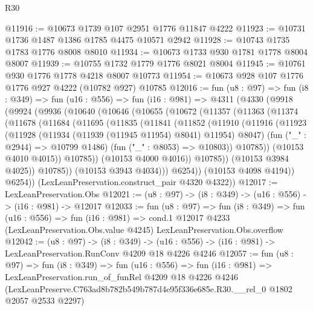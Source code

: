 \begin{lexlean}{R30}
\begin{coremodule}
@11916 := @10673 @1739 @107 @2951 @1776 @11847 @4222
@11923 := @10731 @1736 @1487 @1386 @1785 @4475 @10571 @2942
@11928 := @10743 @1735 @1783 @1776 @8008 @8010
@11934 := @10673 @1733 @930 @1781 @1778 @8004 @8007
@11939 := @10755 @1732 @1779 @1776 @8021 @8004
@11945 := @10761 @930 @1776 @1778 @4218 @8007 @10773
@11954 := @10673 @928 @107 @1776 @1776 @927 @4222 (@10782 @927) @10785
@12016 := fun (u8 : @97) =>
  fun (i8 : @349) =>
  fun (u16 : @556) =>
  fun (i16 : @981) =>
  @4311
    (@4330
      (@9918
        (@9924
          (@9936
            (@10640
              (@10646
                (@10655
                  (@10672
                    (@11357
                      (@11363
                        (@11374
                          (@11678
                            (@11684
                              (@11695
                                (@11835
                                  (@11841
                                    (@11852
                                      (@11910
                                        (@11916
                                          (@11923
                                            (@11928
                                              (@11934 (@11939 (@11945 @11954) @8041) @11954)
                                              @8047)
                                            (fun ("_" : @2944) => @10799 @1486)
                                            (fun ("_" : @8053) => @10803))
                                          @10785))
                                      (@10153 @4010 @4015))
                                    @10785))
                                (@10153 @4000 @4016))
                              @10785))
                          (@10153 @3984 @4025))
                        @10785))
                    (@10153 @3943 @4034)))
                @6254))
            (@10153 @4098 @4194))
          @6254))
      (LexLeanPreservation.construct_pair @4320 @4322))
@12017 := LexLeanPreservation.Obs
@12021 := (u8 : @97) -> (i8 : @349) -> (u16 : @556) -> (i16 : @981) -> @12017
@12033 := fun (u8 : @97) =>
  fun (i8 : @349) =>
  fun (u16 : @556) =>
  fun (i16 : @981) =>
  cond.{1} @12017 @4233 (LexLeanPreservation.Obs.value @4245) LexLeanPreservation.Obs.overflow
@12042 := (u8 : @97) ->
  (i8 : @349) -> (u16 : @556) -> (i16 : @981) -> LexLeanPreservation.RunConv @4209 @18 @4226 @4246
@12057 := fun (u8 : @97) =>
  fun (i8 : @349) =>
  fun (u16 : @556) =>
  fun (i16 : @981) =>
  LexLeanPreservation.run_of_funRel
    @4209
    @18
    @4226
    @4246
    (LexLeanPreserve.C763ad8b782b549b787d4e95f336e685e.R30.__rel_0 @1802 @2057 @2533 @2297)
\end{coremodule}
\end{lexlean}
